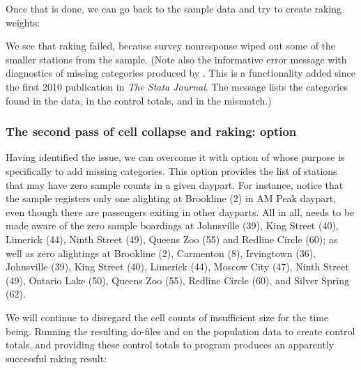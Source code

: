 \begin{stlog}
\nullskip
\end{stlog}

Once that is done, we can go back to the sample data and try to create raking weights:

\begin{stlog}
\nullskip
\end{stlog}

We see that raking failed, because survey nonresponse wiped out some of the smaller
stations from the sample. (Note also the informative error message with
diagnostics of missing categories produced by . This is a functionality
added since the first 2010 publication in \textit{The Stata Journal}. The message lists
the categories found in the data, in the control totals, and in the mismatch.)

\subsubsection{The second pass of cell collapse and raking:  option}

Having identified the issue, we can overcome it with  option
of  whose purpose is specifically to add missing categories.
This option provides the list of stations that may have zero sample counts
in a given daypart.
For instance, notice that the sample registers only one alighting at Brookline (2)
in AM Peak daypart, even though there are passengers exiting in other dayparts. All in all,
 needs to be made aware of the zero sample boardings at
Johnsville (39), King Street (40), Limerick (44), Ninth Street (49),
Queens Zoo (55) and Redline Circle (60); as well as zero alightings at Brookline (2),
Carmenton (8), Irvingtown (36),
Johnsville (39), King Street (40), Limerick (44), Moscow City (47), Ninth Street (49),
Ontario Lake (50), Queens Zoo (55), Redline Circle (60), and Silver Spring (62).

\begin{stlog}
\nullskip
\end{stlog}

We will continue to disregard the cell counts of insufficient size for the time being.
Running the resulting do-files  and 
on the population data to create control totals, and providing these control totals
to  program produces an apparently successful raking result:

